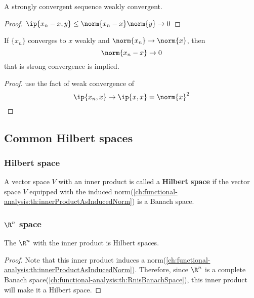 \begin{refsection}
\begin{theorem}
	\cite[98]{debnath2005hilbert}A strongly convergent sequence weakly convergent.
\end{theorem}
\begin{proof}
	$\ip{x_n-x,y}\leq \norm{x_n-x}\norm{y} \to 0$
\end{proof}

\begin{theorem}
	\cite[98]{debnath2005hilbert}If $\{x_n\}$ converges to $x$ weakly and $\norm{x_n}\to \norm{x}$, then $$\norm{x_n - x} \to 0$$ that is strong convergence is implied.
\end{theorem}
\begin{proof}
	use the fact of weak convergence of 
	$$\ip{x_n,x}\to \ip{x,x} = \norm{x}^2$$
\end{proof}

\subsection{Common Hilbert spaces}
\subsubsection{Hilbert space}
\begin{definition}\cite[65]{christensen2010functions}A vector space $V$ with an inner product is called a \textbf{Hilbert space} if the vector space  $V$ equipped with the induced norm(\autoref{ch:functional-analysis:th:innerProductAsInducedNorm}) is a Banach space.
\end{definition}











\subsubsection{$\R^n$ space}
\begin{theorem}\cite[65]{christensen2010functions}
	The $\R^n$ with the inner product is Hilbert spaces. 
\end{theorem}
\begin{proof}
	Note that this inner product induces a norm(\autoref{ch:functional-analysis:th:innerProductAsInducedNorm}). Therefore, since $\R^n$ is a complete Banach space(\autoref{ch:functional-analysis:th:RnisBanachSpace}), this inner product will make it a Hilbert space.	
\end{proof}




\end{refsection}
